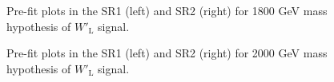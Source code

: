 \begin{figure}[H]
  \centering
  \caption{Pre-fit plots in the SR1 (left) and SR2 (right) for 1800 GeV mass hypothesis of $W'_{\text{L}}$ signal.}
  \label{fig:Prefit_WpLH1800_Asimov}
\end{figure}
\begin{figure}[H]
  \centering
  \caption{Pre-fit plots in the SR1 (left) and SR2 (right) for 2000 GeV mass hypothesis of $W'_{\text{L}}$ signal.}
  \label{fig:Prefit_WpLH2000_Asimov}
\end{figure}
